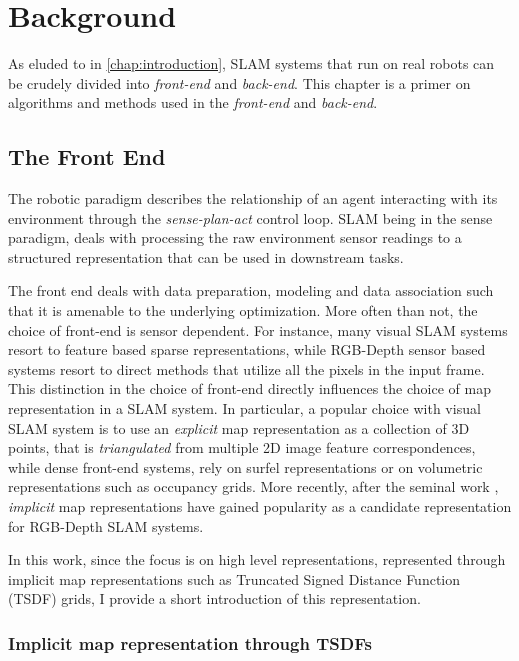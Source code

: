 
\chapter{Background} \label{chap:background}

As eluded to in \ref{chap:introduction}, SLAM systems that run on real robots can be crudely divided into \emph{front-end} and \emph{back-end}. This chapter is a primer on algorithms and methods used in the \emph{front-end} and \emph{back-end}.

\section{The Front End}

The robotic paradigm describes the relationship of an agent interacting with its environment through the \emph{sense-plan-act} control loop. SLAM being in the sense paradigm, deals with processing the raw environment sensor readings to a structured representation that can be used in downstream tasks.

The front end deals with data preparation, modeling and data association such that it is amenable to the underlying optimization. More often than not, the choice of front-end is sensor dependent. For instance, many visual SLAM systems resort to feature based sparse representations, while RGB-Depth sensor based systems resort to direct methods that utilize all the pixels in the input frame. This distinction in the choice of front-end directly influences the choice of map representation in a SLAM system. In particular, a popular choice with visual SLAM system is to use an \emph{explicit} map representation as a collection of 3D points, that is \emph{triangulated} from multiple 2D image feature correspondences, while dense front-end systems, rely on surfel representations or on volumetric representations such as occupancy grids. More recently, after the seminal work \cite{newcombeKinectFusionRealtimeDense2011}, \emph{implicit} map representations have gained popularity as a candidate representation for RGB-Depth SLAM systems.

In this work, since the focus is on high level representations, represented through implicit map representations such as Truncated Signed Distance Function (TSDF) grids, I provide a short introduction of this representation.

\subsection{Implicit map representation through TSDFs}

